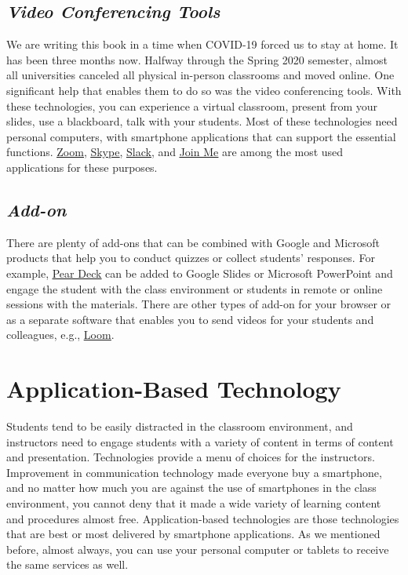 \documentclass{book}
\begin{document}
\hypertarget{video-conferencing-tools}{%
\section{\texorpdfstring{\emph{Video Conferencing
Tools}}{Video Conferencing Tools}}\label{video-conferencing-tools}}

We are writing this book in a time when COVID-19 forced us to stay at home. It
has been three months now. Halfway through the Spring 2020 semester, almost
all universities canceled all physical in-person classrooms and moved online.
One significant help that enables them to do so was the video conferencing
tools. With these technologies, you can experience a virtual classroom,
present from your slides, use a blackboard, talk with your students. Most of
these technologies need personal computers, with smartphone applications that
can support the essential functions.
\href{https://zoom.us/}{\underline{Zoom}},
\href{https://www.skype.com/en/}{\underline{Skype}},
\href{https://slack.com/}{\underline{Slack}}, and
\href{https://www.join.me/}{\underline{Join Me}} are among the most used
applications for these purposes.

\hypertarget{add-on}{%
\section{\texorpdfstring{\emph{Add-on}}{Add-on}}\label{add-on}}

There are plenty of add-ons that can be combined with Google and Microsoft
products that help you to conduct quizzes or collect students' responses. For
example, \href{https://www.peardeck.com/}{\underline{Pear Deck}} can be added
to Google Slides or Microsoft PowerPoint and engage the student with the class
environment or students in remote or online sessions with the materials. There
are other types of add-on for your browser or as a separate software that
enables you to send videos for your students and colleagues, e.g.,
\href{https://www.loom.com/}{\underline{Loom}}.

\hypertarget{application-based-technology}{%
\chapter{Application-Based Technology}\label{application-based-technology}}

Students tend to be easily distracted in the classroom environment, and
instructors need to engage students with a variety of content in terms of
content and presentation. Technologies provide a menu of choices for the
instructors. Improvement in communication technology made everyone buy a
smartphone, and no matter how much you are against the use of smartphones in
the class environment, you cannot deny that it made a wide variety of learning
content and procedures almost free. Application-based technologies are those
technologies that are best or most delivered by smartphone applications. As we
mentioned before, almost always, you can use your personal computer or tablets
to receive the same services as well.
\end{document}
